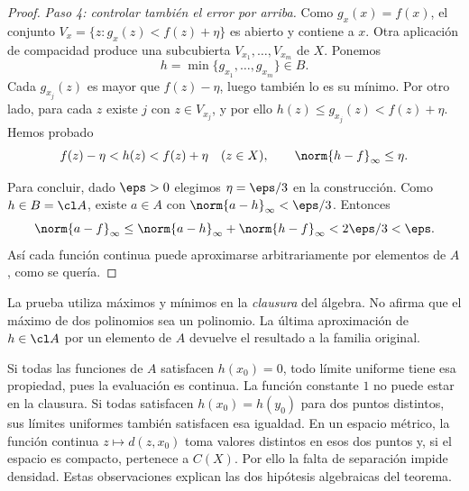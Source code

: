 \begin{proof}
\emph{Paso 4: controlar también el error por arriba.}
Como $g_x(x)=f(x)$, el conjunto
$V_x=\{z:g_x(z)<f(z)+\eta\}$ es abierto y contiene a $x$. Otra aplicación de compacidad produce una subcubierta $V_{x_1},\ldots,V_{x_m}$ de $X$. Ponemos
\[
 h=\min\{g_{x_1},\ldots,g_{x_m}\}\in B.
\]
Cada $g_{x_j}(z)$ es mayor que $f(z)-\eta$, luego también lo es su mínimo. Por otro lado, para cada $z$ existe $j$ con $z\in V_{x_j}$, y por ello
$h(z)\le g_{x_j}(z)<f(z)+\eta$. Hemos probado
\[
 f(z)-\eta<h(z)<f(z)+\eta\quad(z\in X),
 \qquad\norm{h-f}_\infty\le\eta.
\]

Para concluir, dado $\eps>0$ elegimos $\eta=\eps/3$ en la construcción. Como $h\in B=\cl A$, existe $a\in A$ con $\norm{a-h}_\infty<\eps/3$. Entonces
\[
 \norm{a-f}_\infty\le\norm{a-h}_\infty+\norm{h-f}_\infty
 <2\eps/3<\eps.
\]
Así cada función continua puede aproximarse arbitrariamente por elementos de $A$, como se quería.
\end{proof}

La prueba utiliza máximos y mínimos en la \emph{clausura} del álgebra. No afirma que el máximo de dos polinomios sea un polinomio. La última aproximación de $h\in\cl A$ por un elemento de $A$ devuelve el resultado a la familia original.

\begin{ejemplo}
Si todas las funciones de $A$ satisfacen $h(x_0)=0$, todo límite uniforme tiene esa propiedad, pues la evaluación es continua. La función constante $1$ no puede estar en la clausura. Si todas satisfacen $h(x_0)=h(y_0)$ para dos puntos distintos, sus límites uniformes también satisfacen esa igualdad. En un espacio métrico, la función continua $z\mapsto d(z,x_0)$ toma valores distintos en esos dos puntos y, si el espacio es compacto, pertenece a $C(X)$. Por ello la falta de separación impide densidad. Estas observaciones explican las dos hipótesis algebraicas del teorema.
\end{ejemplo}

